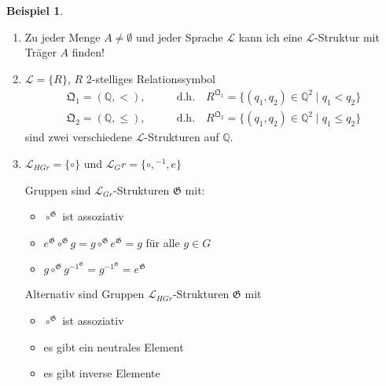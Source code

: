 \documentclass[12pt,parskip=full]{scrartcl}
\newcommand{\setQ}{\mathbb{Q}}
\theoremstyle{definition}
\newtheorem{example}[theorem]{Beispiel}
\begin{document}
	\begin{example}
		\begin{enumerate}[label=\alph*)]
			\item Zu jeder Menge $A \neq \emptyset$ und jeder Sprache $\mathcal{L}$ kann ich eine $\mathcal{L}$-Struktur mit Träger $A$ finden!
			\item $\mathcal{L} = \{ R \}$, $R$ 2-stelliges Relationssymbol
			\begin{align*}
				\mathfrak{Q}_1 = (\setQ, <), &\qquad\text{d.h.}\quad R^{\mathfrak{Q}_1} = \{ (q_1, q_2) \in \setQ^2 \mid q_1 < q_2 \} \\
				\mathfrak{Q}_2 = (\setQ, \leq), &\qquad\text{d.h.}\quad R^{\mathfrak{Q}_2} = \{ (q_1, q_2) \in \setQ^2 \mid q_1 \leq q_2 \}
			\end{align*}
			sind zwei verschiedene $\mathcal{L}$-Strukturen auf $\setQ$.
			\item $\mathcal{L}_{HGr} = \{ \circ \}$ und $\mathcal{L}_Gr = \{ \circ, {}^{-1}, e \}$
			
			Gruppen sind $\mathcal{L}_{Gr}$-Strukturen $\mathfrak{G}$ mit:
			\begin{itemize}
				\item $\circ^\mathfrak{G}$ ist assoziativ
				\item $e^\mathfrak{G} \circ^\mathfrak{G} g = g \circ^\mathfrak{G} e^\mathfrak{G} = g$ für alle $g \in G$
				\item $g \circ ^\mathfrak{G} g^{-1^\mathfrak{G}} = g^{-1^\mathfrak{G}} = e^\mathfrak{G}$
			\end{itemize}
		
			Alternativ sind Gruppen $\mathcal{L}_{HGr}$-Strukturen $\mathfrak{G}$ mit
			\begin{itemize}
				\item $\circ^\mathfrak{G}$ ist assoziativ
				\item es gibt ein neutrales Element
				\item es gibt inverse Elemente
			\end{itemize}
		\end{enumerate}
	\end{example}
\end{document}
